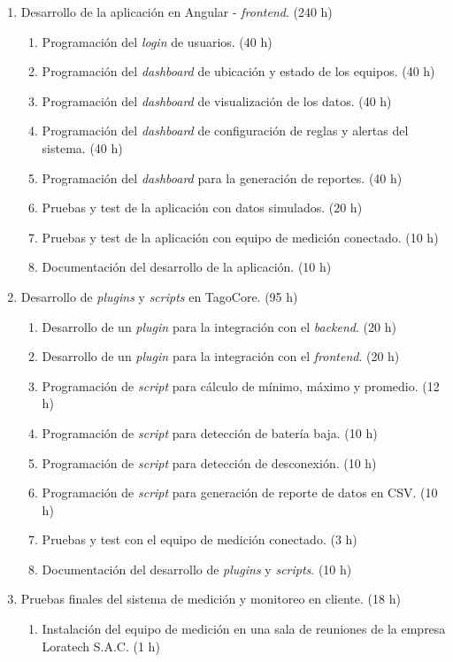 \documentclass[
11pt, %
]{charter}
\begin{document}
\begin{enumerate}
\item Desarrollo de la aplicación en Angular - \textit{frontend}.   (240 h)
	\begin{enumerate}
	\item Programación del \textit{login} de usuarios. (40 h) 
	\item Programación del \textit{dashboard} de ubicación y estado de los equipos. (40 h)
	\item Programación del \textit{dashboard} de visualización de los datos.  (40 h)
	\item Programación del \textit{dashboard} de configuración de reglas y alertas del sistema. (40 h)
	\item Programación del \textit{dashboard} para la generación de reportes. (40 h)
	\item Pruebas y test de la aplicación con datos simulados. (20 h)
	\item Pruebas y test de la aplicación con equipo de medición conectado. (10 h)
	\item Documentación del desarrollo de la aplicación. (10 h)
	\end{enumerate}
\item Desarrollo de \textit{plugins} y  \textit{scripts} en TagoCore. (95 h)
	\begin{enumerate}
	\item Desarrollo de un \textit{plugin} para la integración con el \textit{backend}. (20 h)
	\item Desarrollo de un \textit{plugin} para la integración con el \textit{frontend}. (20 h)
	\item Programación de \textit{script} para cálculo de mínimo, máximo y promedio.  (12 h)
	\item Programación de \textit{script} para detección de batería baja. (10 h)
	\item Programación de \textit{script} para detección de desconexión. (10 h)
	\item Programación de \textit{script} para generación de reporte de datos en CSV. (10 h)
	\item Pruebas y test con el equipo de medición conectado. (3 h)
	\item Documentación del desarrollo de \textit{plugins} y \textit{scripts}. (10 h)
	\end{enumerate}
\item Pruebas finales del sistema de medición y monitoreo en cliente.   (18 h)
	\begin{enumerate}
	\item Instalación del equipo de medición en una sala de reuniones de la empresa Loratech S.A.C. (1 h)

\end{enumerate}
\end{enumerate}
\end{document}
